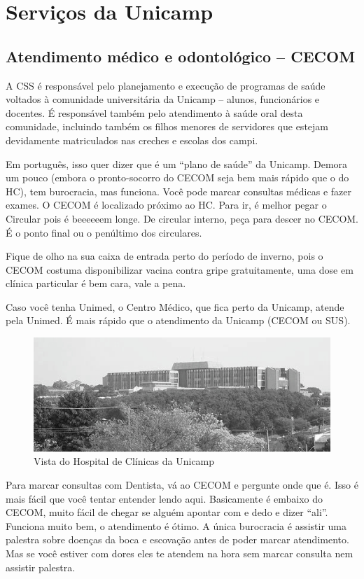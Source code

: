 
\section{Serviços da Unicamp}
\subsection{Atendimento médico e odontológico -- CECOM}

A CSS é responsável pelo planejamento e execução de programas de saúde voltados
à comunidade universitária da Unicamp -- alunos, funcionários e docentes.  É
responsável também pelo atendimento à saúde oral desta comunidade, incluindo
também os filhos menores de servidores que estejam devidamente matriculados nas
creches e escolas dos campi.

Em português, isso quer dizer que é um ``plano de saúde'' da Unicamp. Demora um
pouco (embora o pronto-socorro do CECOM seja bem mais rápido que o do HC), tem
burocracia, mas funciona. Você pode marcar consultas médicas e fazer exames.  O
CECOM é localizado próximo ao HC. Para ir, é melhor pegar o Circular pois é
beeeeeem longe. De circular interno, peça para descer no CECOM. É o ponto final
ou o penúltimo dos circulares.

Fique de olho na sua caixa de entrada perto do período de inverno, pois o CECOM
costuma disponibilizar vacina contra gripe gratuitamente, uma dose em clínica
particular é bem cara, vale a pena.

Caso você tenha Unimed, o Centro Médico, que fica perto da Unicamp, atende pela
Unimed. É mais rápido que o atendimento da Unicamp (CECOM ou SUS).

\begin{figure}[h!]
    \centering
    \includegraphics[width=.45\textwidth]{img/alem_da_graduacao/hc.jpg}
    \caption{Vista do Hospital de Clínicas da Unicamp}
\end{figure}

Para marcar consultas com Dentista, vá ao CECOM e pergunte onde que é. Isso é
mais fácil que você tentar entender lendo aqui. Basicamente é embaixo do CECOM,
muito fácil de chegar se alguém apontar com e dedo e dizer ``ali''. Funciona
muito bem, o atendimento é ótimo. A única burocracia é assistir uma palestra
sobre doenças da boca e escovação antes de poder marcar atendimento. Mas se você
estiver com dores eles te atendem na hora sem marcar consulta nem assistir
palestra.

